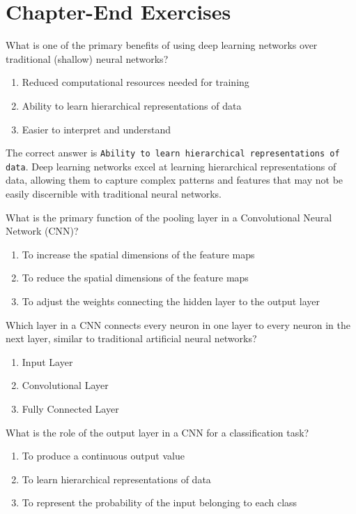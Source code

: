 \newpage
\section{Chapter-End Exercises}\label{sec:exercises}
\begin{question}
What is one of the primary benefits of using deep learning networks over traditional (shallow) neural networks?
\begin{enumerate}[a] %
    \item Reduced computational resources needed for training
    \item Ability to learn hierarchical representations of data
    \item Easier to interpret and understand    
\end{enumerate}
\end{question} 

\begin{answer}
The correct answer is \texttt{Ability to learn hierarchical representations of data}. Deep learning networks excel at learning hierarchical representations of data, allowing them to capture complex patterns and features that may not be easily discernible with traditional neural networks.
\end{answer}

\begin{question}
What is the primary function of the pooling layer in a Convolutional Neural Network (CNN)?
\begin{enumerate}[a]
\item To increase the spatial dimensions of the feature maps
\item To reduce the spatial dimensions of the feature maps
\item To adjust the weights connecting the hidden layer to the output layer
\end{enumerate}
\end{question} 

\begin{question}
Which layer in a CNN connects every neuron in one layer to every neuron in the next layer, similar to traditional artificial neural networks?
\begin{enumerate}[a]
\item Input Layer
\item Convolutional Layer
\item Fully Connected Layer
\end{enumerate}
\end{question}

\begin{question}
What is the role of the output layer in a CNN for a classification task?
\begin{enumerate}[a]
\item To produce a continuous output value
\item To learn hierarchical representations of data
\item To represent the probability of the input belonging to each class
\end{enumerate}
\end{question} 